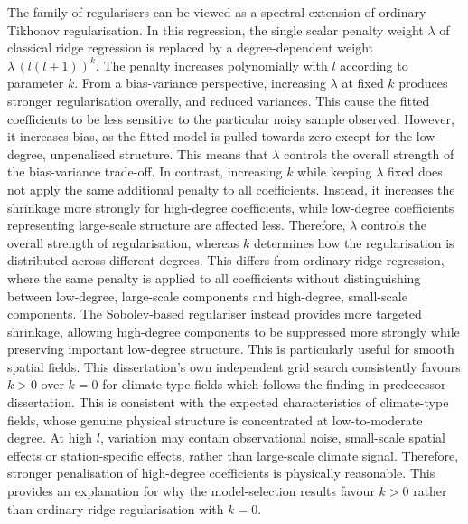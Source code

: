 \documentclass[11pt,a4paper]{report}
\begin{document}
The family of regularisers can be viewed as a spectral extension of ordinary Tikhonov regularisation. In this regression, the single scalar penalty weight $\lambda$ of classical ridge regression is replaced by a degree-dependent weight $\lambda\,(l(l+1))^k$. The penalty increases polynomially with $l$ according to parameter $k$. From a bias-variance perspective, increasing $\lambda$ at fixed $k$ produces stronger regularisation overally, and reduced variances. This cause the fitted coefficients to be less sensitive to the particular noisy sample observed. However, it increases bias, as the fitted model is pulled towards zero except for the low-degree, unpenalised structure. This means that $\lambda$ controls the overall strength of the bias-variance trade-off. In contrast, increasing $k$ while keeping $\lambda$ fixed does not apply the same additional penalty to all coefficients. Instead, it increases the shrinkage more strongly for high-degree coefficients, while low-degree coefficients representing large-scale structure are affected less. Therefore, $\lambda$ controls the overall strength of regularisation, whereas $k$ determines how the regularisation is distributed across different degrees. This differs from ordinary ridge regression, where the same penalty is applied to all coefficients without distinguishing between low-degree, large-scale components and high-degree, small-scale components. The Sobolev-based regulariser instead provides more targeted shrinkage, allowing high-degree components to be suppressed more strongly while preserving important low-degree structure. This is particularly useful for smooth spatial fields. This dissertation's own independent grid search consistently favours $k>0$ over $k=0$ for climate-type fields which follows the finding in predecessor dissertation. This is consistent with the expected characteristics of climate-type fields, whose genuine physical structure is concentrated at low-to-moderate degree. At high $l$, variation may contain observational noise, small-scale spatial effects or station-specific effects,  rather than large-scale climate signal. Therefore, stronger penalisation of high-degree coefficients is physically reasonable. This provides an explanation for why the model-selection results favour $k>0$ rather than ordinary ridge regularisation with $k=0$.
\end{document}
